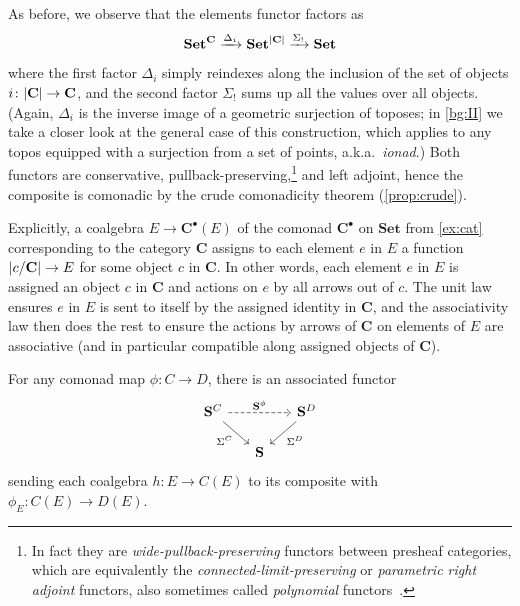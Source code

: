 \documentclass[11pt, oneside, article]{memoir}
\theoremstyle{plain}
\theoremstyle{definition}
\theoremstyle{remark}
\newenvironment{example}
{\renewcommand\qedsymbol{$\lrcorner$}%
  \pushQED{\qed}\myexample}
{\popQED\endmyexample}
\DeclarePairedDelimiter{\abs}{\lvert}{\rvert}
\newcommand{\dash}{{\mathord{\text{--}}}}
\newcommand{\xto}[1]{\xrightarrow{#1}}
\newcommand{\cocolon}{\!:\!}
\newcommand{\bang}{\mathrm{!}}
\newcommand{\namedcat}[1]{\mathbf{#1}}
\newcommand{\cat}[1]{\mathbf{#1}}
\newcommand{\Set}{\namedcat{Set}}
\newcommand{\CoalgOn}[2]{{#2}^{#1}}
\newcommand{\CoalgS}[1]{\CoalgOn{#1}{\bS}}
\newcommand{\pts}[1]{{\abs{#1}}}
\newcommand{\obs}[1]{\pts{#1}}
\newcommand{\carr}{\Sigma}
\newcommand{\reindex}[1]{\Delta_{#1}}
\newcommand{\slicel}{\Sigma_\bang}
\newcommand{\car}[1]{\carr^{#1}}
\newcommand{\carC}{\car{\cC}}
\newcommand{\carD}{\car{\cD}}
\newcommand{\com}[2]{{#1}^{#2}}
\newcommand{\comr}[2]{R}
\newcommand{\fun}[2]{{#2}^{#1}}
\newcommand{\cmnd}[1]{{#1}}
\newcommand{\eE}{E}
\newcommand{\xA}{A}
\newcommand{\xX}{X}
\newcommand{\hH}{h}
\newcommand{\cC}{\cmnd{C}}
\newcommand{\cD}{\cmnd{D}}
\newcommand{\bC}{\cat{C}}
\newcommand{\bS}{\cat{S}}
\newcommand{\cbC}{\cattocmd{\bC}}
\newcommand{\CS}{\CoalgS{\cC}}
\newcommand{\DS}{\CoalgS{\cD}}
\newcommand{\cattocmd}[1]{{{#1}^\bullet}}
\begin{document}
\begin{example}[Sheaves and presheaves]
  As before, we observe that the elements functor factors as
  \[\fun{\bC}{\Set} \xto{\reindex{i}} \Set^{\obs{\bC}} \xto{\slicel} \Set\]
  where the first factor $\reindex{i}$ simply reindexes along the
  inclusion of the set of objects $i \colon \obs{\bC} \to \bC$, and
  the second factor $\slicel$ sums up all the values over all
  objects. (Again, $\reindex{i}$ is the inverse image of a geometric
  surjection of toposes; in \cref{bg:II} we take a closer look at the
  general case of this construction, which applies to any topos
  equipped with a surjection from a set of points, a.k.a.\
  \emph{ionad}.)  Both functors are conservative,
  pullback-preserving,\footnote{In fact they are
    \emph{wide-pullback-preserving} functors between presheaf
    categories, which are equivalently the
    \emph{connected-limit-preserving} or \emph{parametric right
      adjoint} functors, also sometimes called \emph{polynomial}
    functors~\cite{spivak-garner-fairbanks}.} and left adjoint, hence
  the composite is comonadic by
  the crude comonadicity theorem (\cref{prop:crude}).

  Explicitly, a coalgebra $\eE \to \cbC(\eE)$ of the comonad
  $\cbC$ on $\Set$ from \cref{ex:cat} corresponding to the
  category $\bC$ assigns to each element $e$ in $\eE$ a function
  $\obs{c / \bC} \to \eE$ for some object $c$ in $\bC$. In other
  words, each element $e$ in $\eE$ is assigned an object $c$ in $\bC$
  and actions on $e$ by all arrows out of $c$. The unit law ensures
  $e$ in $\eE$ is sent to itself by the assigned identity in $\bC$,
  and the associativity law then does the rest to ensure the actions
  by arrows of $\bC$ on elements of $\eE$ are associative (and in
  particular compatible along assigned objects of $\bC$).
\end{example}

For any comonad map $\phi\colon\cC\to\cD$, there is an
associated functor
\[
  \begin{tikzcd}[column sep=15pt, row sep=15pt]
    \CS\ar[rr, dashed, "\com{\bS}{\phi}"]\ar[dr, "\carC"']&&\DS\ar[dl, "\carD"]\\
    &\bS
  \end{tikzcd}
\]
sending each coalgebra $\hH:\eE\to\cC(\eE)$ to its composite with
$\phi_\eE \colon \cC(\eE) \to \cD(\eE)$.

\end{document}
